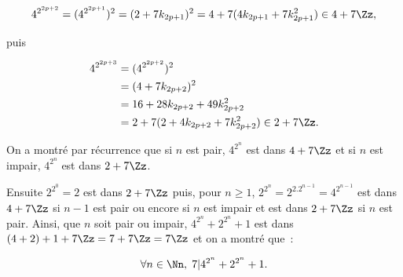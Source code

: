 {\begin{enumerate}
{$$4^{2^{2p+2}}=(4^{2^{2p+1}})^2=(2+7k_{2p+1})^2=4+7(4k_{2p+1}+7k_{2p+1}^2)\in4+7\Zz,$$

puis 

\begin{align*}
4^{2^{2p+3}} &= (4^{2^{2p+2}})^2 \\
&= (4+7k_{2p+2})^2 \\
&= 16+28k_{2p+2}+49k_{2p+2}^2 \\
&= 2+7(2+4k_{2p+2}+7k_{2p+2}^2)\in2+7\Zz.
\end{align*}

On a montré par récurrence que si $n$ est pair, $4^{2^n}$ est dans $4+7\Zz$ et si $n$ est impair, $4^{2^n}$ est dans $2+7\Zz$.

Ensuite $2^{2^0}=2$ est dans $2+7\Zz$ puis, pour $n\geq1$, $2^{2^n}=2^{2.2^{n-1}}=4^{2^{n-1}}$ est dans $4+7\Zz$ si $n-1$ est pair ou encore si $n$ est impair et est dans $2+7\Zz$ si $n$ est pair. Ainsi, que $n$ soit pair ou impair, $4^{2^n}+2^{2^n}+1$ est dans $(4+2)+1+7\Zz=7+7\Zz=7\Zz$ et on a montré que~:

$$\forall n\in\Nn,\;7|4^{2^n}+2^{2^n}+1.$$}
\end{enumerate}
}
